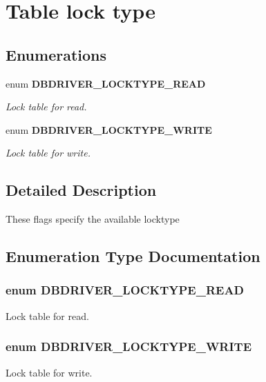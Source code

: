\section{Table lock type}
\label{group__DBDRIVER__TableLock}
\subsection*{Enumerations}
\begin{DoxyCompactItemize}
\item 
enum {\bf DBDRIVER\_\-LOCKTYPE\_\-READ} 
\begin{DoxyCompactList}\small\item\em Lock table for read. \end{DoxyCompactList}\item 
enum {\bf DBDRIVER\_\-LOCKTYPE\_\-WRITE} 
\begin{DoxyCompactList}\small\item\em Lock table for write. \end{DoxyCompactList}\end{DoxyCompactItemize}


\subsection{Detailed Description}
These flags specify the available locktype 

\subsection{Enumeration Type Documentation}
\subsubsection[{DBDRIVER\_\-LOCKTYPE\_\-READ}]{\setlength{\rightskip}{0pt plus 5cm}enum {\bf DBDRIVER\_\-LOCKTYPE\_\-READ}}\label{group__DBDRIVER__TableLock_ga5c56b5f9057593dbaa31052f7c7fc08f}


Lock table for read. 

\subsubsection[{DBDRIVER\_\-LOCKTYPE\_\-WRITE}]{\setlength{\rightskip}{0pt plus 5cm}enum {\bf DBDRIVER\_\-LOCKTYPE\_\-WRITE}}\label{group__DBDRIVER__TableLock_ga17757dbe21de27501af94e33738598bf}


Lock table for write. 

